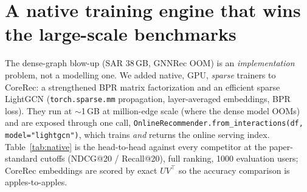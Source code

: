 \documentclass[10pt]{article}
\begin{document}
\section{A native training engine that wins the large-scale benchmarks}
\label{sec:native}
The dense-graph blow-up (SAR 38\,GB, GNNRec OOM) is an \emph{implementation}
problem, not a modelling one. We added native, GPU, \emph{sparse} trainers to
CoreRec: a strengthened BPR matrix factorization and an efficient sparse LightGCN
(\texttt{torch.sparse.mm} propagation, layer-averaged embeddings, BPR loss). They
run at $\sim$1\,GB at million-edge scale (where the dense model OOMs) and are
exposed through one call,
\texttt{OnlineRecommender.from\_interactions(df, model="lightgcn")}, which trains
\emph{and} returns the online serving index. Table~\ref{tab:native} is the
head-to-head against every competitor at the paper-standard cutoffs (NDCG@20 /
Recall@20), full ranking, 1000 evaluation users; CoreRec embeddings are scored by
exact $U V^\top$ so the accuracy comparison is apples-to-apples.
\end{document}

